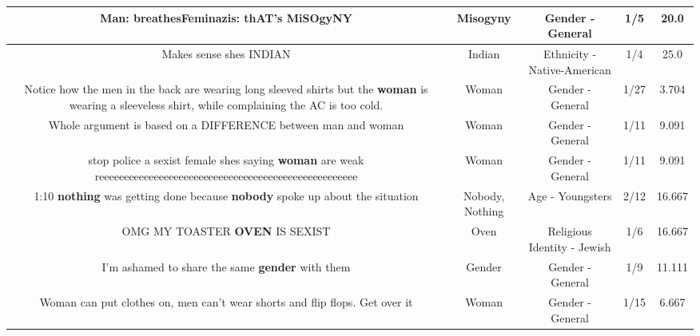 \documentclass[11pt]{article}
\newlength\mylength
\begin{document}
\begin{center}
\begin{longtable}{|C{.65\mylength}|C{.30\mylength}|C{.12\mylength}|C{.12\mylength}|C{.12\mylength}|}
  \small Man: breathesFeminazis: thAT's MiSOgyNY\normalsize   & Misogyny & Gender - General & 1/5 & 20.0 \\  \hline
  \small Makes sense shes INDIAN\normalsize   & Indian & Ethnicity - Native-American & 1/4 & 25.0 \\  \hline
  \small Notice how the men in the back are wearing long sleeved shirts but the \textbf{woman} is wearing a sleeveless shirt, while complaining the AC is too cold.\normalsize   & Woman & Gender - General & 1/27 & 3.704 \\  \hline
  \small Whole argument is based on a DIFFERENCE between man and woman\normalsize   & Woman & Gender - General & 1/11 & 9.091 \\  \hline
  \small stop police a sexist female shes saying \textbf{woman} are weak reeeeeeeeeeeeeeeeeeeeeeeeeeeeeeeeeeeeeeeeeeeeeeeeeeee\normalsize   & Woman & Gender - General & 1/11 & 9.091 \\  \hline
  \small 1:10 \textbf{nothing} was getting done because \textbf{nobody} spoke up about the situation\normalsize   & Nobody, Nothing & Age - Youngsters & 2/12 & 16.667 \\  \hline
  \small OMG MY TOASTER \textbf{OVEN} IS SEXIST\normalsize   & Oven & Religious Identity - Jewish & 1/6 & 16.667 \\  \hline
  \small I'm ashamed to share the same \textbf{gender} with them\normalsize   & Gender & Gender - General & 1/9 & 11.111 \\  \hline
  \small Woman can put clothes on, men can't wear shorts and flip flops.  Get over it\normalsize   & Woman & Gender - General & 1/15 & 6.667 \\  \hline

\end{longtable}
\end{center}
\end{document}

